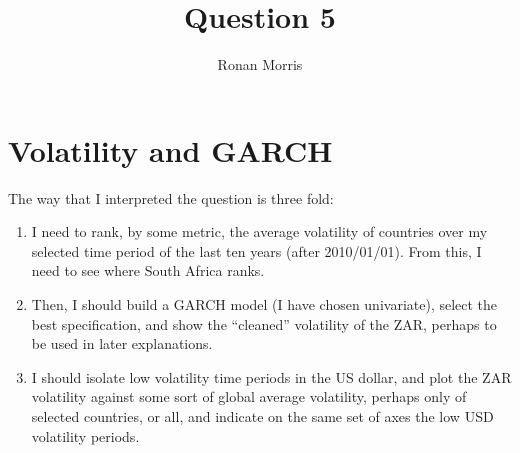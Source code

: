 \documentclass[11pt,preprint, authoryear]{elsarticle}
\numberwithin{equation}{section}
\numberwithin{figure}{section}
\numberwithin{table}{section}
\begin{document}
\begin{frontmatter}  %

\title{Question 5}





\author[Add1]{Ronan Morris}





\address[Add1]{Stellenbosch University}



\vspace{1cm}





\vspace{0.5cm}

\end{frontmatter}

\setcounter{footnote}{0}



\pagestyle{fancy}
\chead{}
\rhead{}
\lfoot{}
\lhead{}
\cfoot{}


\headsep 35pt %




\hypertarget{volatility-and-garch}{%
\section{Volatility and GARCH}\label{volatility-and-garch}}

The way that I interpreted the question is three fold:

\begin{enumerate}
\def\labelenumi{\arabic{enumi}.}
\item
  I need to rank, by some metric, the average volatility of countries
  over my selected time period of the last ten years (after 2010/01/01).
  From this, I need to see where South Africa ranks.
\item
  Then, I should build a GARCH model (I have chosen univariate), select
  the best specification, and show the ``cleaned'' volatility of the
  ZAR, perhaps to be used in later explanations.
\item
  I should isolate low volatility time periods in the US dollar, and
  plot the ZAR volatility against some sort of global average
  volatility, perhaps only of selected countries, or all, and indicate
  on the same set of axes the low USD volatility periods.
\end{enumerate}
\end{document}
